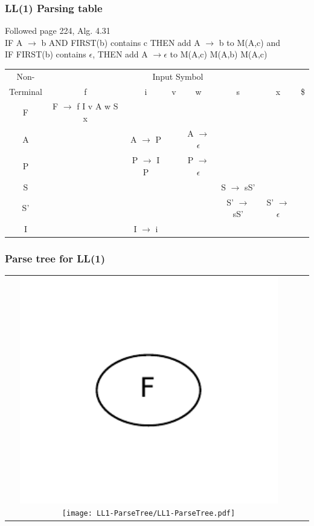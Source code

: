 \documentclass{article}
\begin{document}
\subsubsection*{LL(1) Parsing table}
Followed page 224, Alg. 4.31\\
IF A $\rightarrow$ b AND FIRST(b) contains c THEN add A $\rightarrow$ b to
M(A,c) and\\
IF FIRST(b) contains $\epsilon$, THEN add A $\rightarrow \epsilon$ to M(A,c)
M(A,b) M(A,c)\\
\begin{tabular}{|c|c|c|c|c|c|c|c|}
\hline
Non- & \multicolumn{7}{c|}{Input Symbol}\\
\cline{2-8}
Terminal & f & i & v & w & s & x & \$ \\
\hline
\hline
F  & F $\rightarrow$ f I v A w S x & & & & & & \\
\hline
A  & & A $\rightarrow$ P & & A $\rightarrow$ $\epsilon$ & & & \\
\hline
P  & & P $\rightarrow$ I P & & P $\rightarrow$ $\epsilon$ & & & \\
\hline
S  & & & & & S $\rightarrow$ sS' & & \\
\hline
S' & & & & & S' $\rightarrow$ sS' & S' $\rightarrow$ $\epsilon$ & \\
\hline
I  & & I $\rightarrow$ i & & & & & \\
\hline
\end{tabular}

\subsubsection{Parse tree for LL(1)}
\begin{tabular}{ccc}
\includegraphics[width=427px]{LL1-ParseTree/1.pdf}
\texttt{[image: LL1-ParseTree/LL1-ParseTree.pdf]}
\end{tabular}

\printindex
\end{document}
